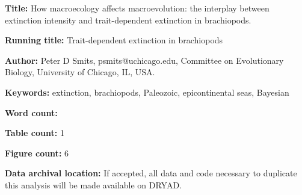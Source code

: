 \documentclass{article}
\begin{document}
\linenumbers
\modulolinenumbers[2]


\begin{titlepage}
  \begin{large}
    \textbf{Title:} How macroecology affects macroevolution: the interplay between extinction intensity and trait-dependent extinction in brachiopods.
  \end{large}

  \textbf{Running title:} Trait-dependent extinction in brachiopods

  \textbf{Author:} Peter D Smits, psmits@uchicago.edu, Committee on Evolutionary Biology, University of Chicago, IL, USA.

  \textbf{Keywords:} extinction, brachiopods, Paleozoic, epicontinental seas, Bayesian

  \textbf{Word count:} 
  
  \textbf{Table count:} 1
 
  \textbf{Figure count:} 6

  \textbf{Data archival location:} If accepted, all data and code necessary to duplicate this analysis will be made available on DRYAD.

\end{titlepage}
\end{document}
